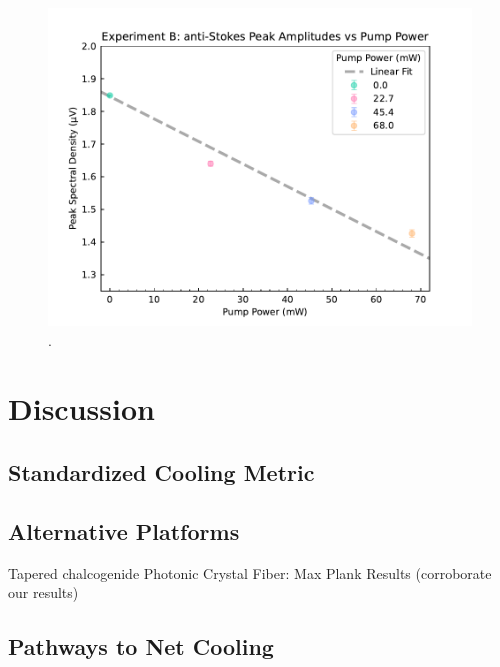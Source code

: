\begin{figure}[t]
  \centering
  \includegraphics[width=\textwidth]{figs/3-Cooling/P-P anti-Stokes Height v Pow.pdf}
  \caption{.}
  \label{fig:Cooling:P-P anti-Stokes Height v Pow}
\end{figure}


\section{Discussion}
\label{Cooling:sec:Discussion}

\subsection{Standardized Cooling Metric}
\label{Cooling:subsec:StandardizedCoolingMetric}


\subsection{Alternative Platforms}
\label{Cooling:subsec:AlternativePlatforms}

Tapered chalcogenide Photonic Crystal Fiber: Max Plank Results (corroborate our results)

\subsection{Pathways to Net Cooling}
\label{Cooling:subsec:PathwaystoNetCooling}


